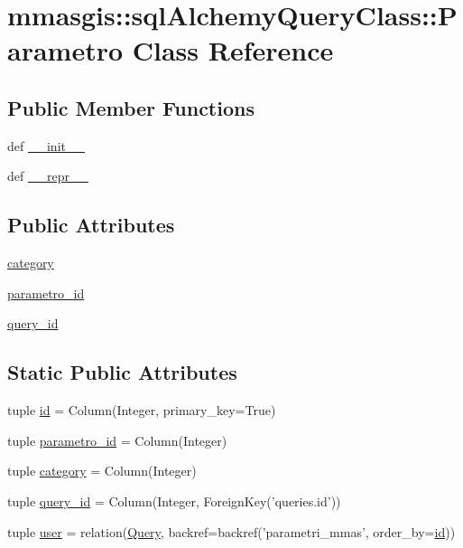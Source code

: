\hypertarget{classmmasgis_1_1sqlAlchemyQueryClass_1_1Parametro}{
\section{mmasgis::sqlAlchemyQueryClass::Parametro Class Reference}
\label{classmmasgis_1_1sqlAlchemyQueryClass_1_1Parametro}
}
\subsection*{Public Member Functions}
\begin{DoxyCompactItemize}
\item 
def \hyperlink{classmmasgis_1_1sqlAlchemyQueryClass_1_1Parametro_a223b229e03c5c414dcd42b77c357dbfd}{\_\-\_\-init\_\-\_\-}
\item 
def \hyperlink{classmmasgis_1_1sqlAlchemyQueryClass_1_1Parametro_a6e811821f8d07bd41c9137a95e50f86a}{\_\-\_\-repr\_\-\_\-}
\end{DoxyCompactItemize}
\subsection*{Public Attributes}
\begin{DoxyCompactItemize}
\item 
\hyperlink{classmmasgis_1_1sqlAlchemyQueryClass_1_1Parametro_a9b2d3ac13e1cf4e76fdfd20ee5294e99}{category}
\item 
\hyperlink{classmmasgis_1_1sqlAlchemyQueryClass_1_1Parametro_a120d8827ed68af3c6314efbf5b06d036}{parametro\_\-id}
\item 
\hyperlink{classmmasgis_1_1sqlAlchemyQueryClass_1_1Parametro_a331133b30c1267ce7fe6c652cda810ef}{query\_\-id}
\end{DoxyCompactItemize}
\subsection*{Static Public Attributes}
\begin{DoxyCompactItemize}
\item 
tuple \hyperlink{classmmasgis_1_1sqlAlchemyQueryClass_1_1Parametro_a27bb100b132e671d5b110bd09dbef32a}{id} = Column(Integer, primary\_\-key=True)
\item 
tuple \hyperlink{classmmasgis_1_1sqlAlchemyQueryClass_1_1Parametro_a69d4ac4b7a7caad6c1f6bc929419822f}{parametro\_\-id} = Column(Integer)
\item 
tuple \hyperlink{classmmasgis_1_1sqlAlchemyQueryClass_1_1Parametro_aad09537d22a98d598f86ced16f08110e}{category} = Column(Integer)
\item 
tuple \hyperlink{classmmasgis_1_1sqlAlchemyQueryClass_1_1Parametro_ae7ad55cbc3b1cf794e84b22dca040122}{query\_\-id} = Column(Integer, ForeignKey('queries.id'))
\item 
tuple \hyperlink{classmmasgis_1_1sqlAlchemyQueryClass_1_1Parametro_abc6071696bfdd0160b1c56c68766dcb0}{user} = relation(\hyperlink{classmmasgis_1_1sqlAlchemyQueryClass_1_1Query}{Query}, backref=backref('parametri\_\-mmas', order\_\-by=\hyperlink{classmmasgis_1_1sqlAlchemyQueryClass_1_1Parametro_a27bb100b132e671d5b110bd09dbef32a}{id}))
\end{DoxyCompactItemize}
